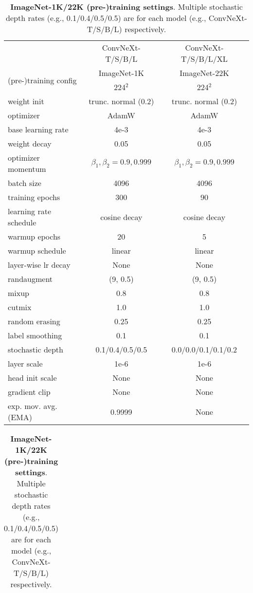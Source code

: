 \begin{table}[ht]
\tiny
\begin{minipage}{.55\linewidth}
\centering
\begin{tabular}{@{\hskip -0.05ex}l|c@{\hskip 1ex}c}
& ConvNeXt-T/S/B/L & ConvNeXt-T/S/B/L/XL \\
\multirow{2}{*}{(pre-)training config} & ImageNet-1K & ImageNet-22K \\
& 224$^2$ & 224$^2$ \\
\hline
weight init & trunc. normal (0.2) & trunc. normal (0.2) \\
optimizer & AdamW & AdamW\\
base learning rate & 4e-3 & 4e-3 \\
weight decay & 0.05 & 0.05 \\
optimizer momentum & $\beta_1, \beta_2{=}0.9, 0.999$ & $\beta_1, \beta_2{=}0.9, 0.999$ \\
batch size & 4096 & 4096 \\
training epochs & 300 & 90 \\
learning rate schedule & cosine decay & cosine decay \\
warmup epochs & 20 & 5 \\
warmup schedule & linear & linear \\
layer-wise lr decay  & None & None \\
randaugment  & (9, 0.5) & (9, 0.5) \\
mixup  & 0.8 & 0.8 \\
cutmix  & 1.0 & 1.0 \\
random erasing  & 0.25 & 0.25 \\
label smoothing  & 0.1 & 0.1 \\
stochastic depth & 0.1/0.4/0.5/0.5 & 0.0/0.0/0.1/0.1/0.2 \\
layer scale & 1e-6 & 1e-6 \\
head init scale  & None & None \\
gradient clip & None & None \\
exp. mov. avg. (EMA) & 0.9999 & None\\
\end{tabular}
\caption{\textbf{ImageNet-1K/22K (pre-)training settings}. Multiple stochastic depth rates (e.g., 0.1/0.4/0.5/0.5) are for each model (e.g., ConvNeXt-T/S/B/L) respectively.}
\label{tab:train_detail}
\end{minipage}%
\begin{minipage}{.4\linewidth}
\centering
\begin{tabular}{@{\hskip -0.05ex}l@{\hskip 2.6ex}|cc}

\end{tabular}
\end{minipage}
\end{table}

